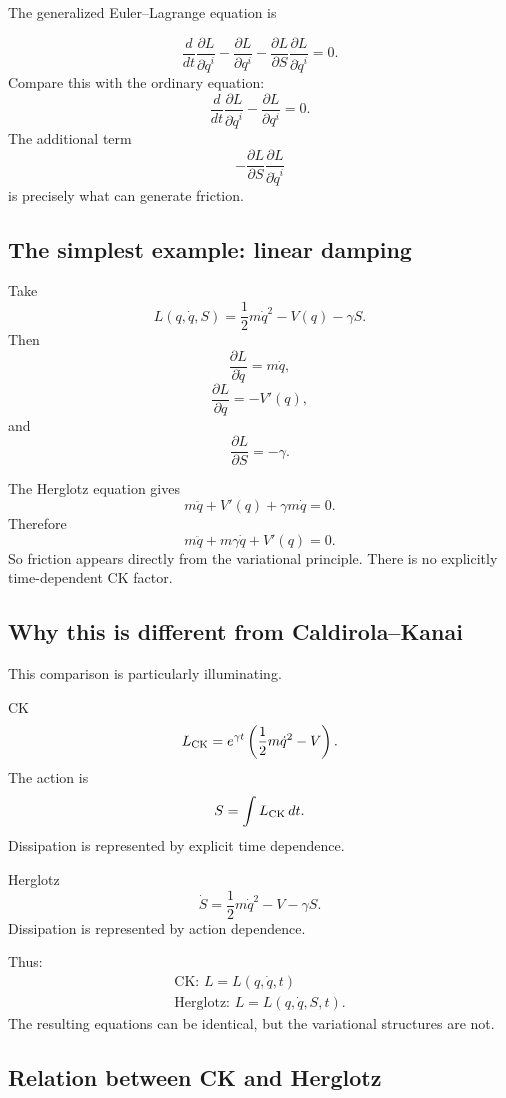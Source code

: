 The generalized Euler–Lagrange equation is

$$ \boxed{ \frac{d}{dt} \frac{\partial L}{\partial\dot q^i} - \frac{\partial L}{\partial q^i} - \frac{\partial L}{\partial S} \frac{\partial L}{\partial\dot q^i} =0. } $$
Compare this with the ordinary equation:
$$ \frac{d}{dt} \frac{\partial L}{\partial\dot q^i} - \frac{\partial L}{\partial q^i} =0. $$
The additional term
$$ \boxed{ -\frac{\partial L}{\partial S} \frac{\partial L}{\partial\dot q^i} } $$
is precisely what can generate friction.

\subsection{The simplest example: linear damping}

Take $$\boxed{L(q,\dot q,S)=\frac12m\dot q^2-V(q)-\gamma S.} $$
Then
$$ \frac{\partial L}{\partial\dot q}=m\dot q, $$ $$ \frac{\partial L}{\partial q}=-V'(q), $$
and $$ \frac{\partial L}{\partial S}=-\gamma. $$

The Herglotz equation gives
$$ m\ddot q+V'(q)+\gamma m\dot q=0. $$
Therefore
$$ \boxed{ m\ddot q+m\gamma\dot q+V'(q)=0. } $$
So friction appears directly from the variational principle.
There is no explicitly time-dependent CK factor.

\subsection{Why this is different from Caldirola–Kanai}

This comparison is particularly illuminating.

CK $$ L_{\rm CK} = e^{\gamma t} \left( \frac12m\dot q^2-V \right). $$
The action is $$ S=\int L_{\rm CK}\,dt. $$
Dissipation is represented by explicit time dependence.

Herglotz $$ \dot S = \frac12m\dot q^2-V-\gamma S. $$
Dissipation is represented by action dependence.

Thus:
$$ \boxed{ \begin{array}{c} \text{CK: }L=L(q,\dot q,t)\\[2mm] \text{Herglotz: }L=L(q,\dot q,S,t). \end{array}} $$
The resulting equations can be identical, but the variational structures are not.

\subsection{Relation between CK and Herglotz}

